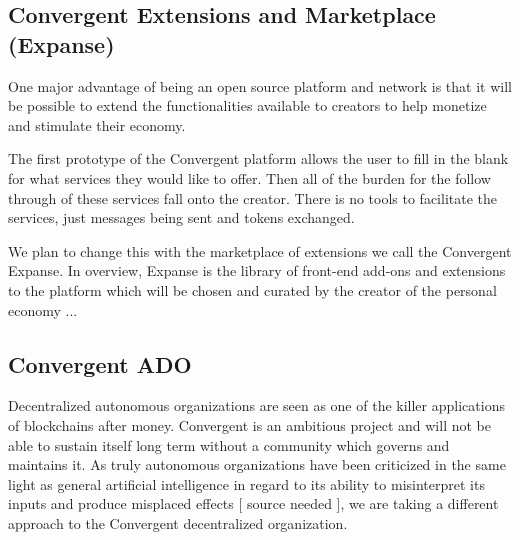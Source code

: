 \documentclass[a4paper]{article}
\begin{document}
\subsection{Convergent Extensions and Marketplace (Expanse)}

One major advantage of being an open source platform and network is that it will be possible to extend the functionalities available to creators to help monetize and stimulate their economy. 

The first prototype of the Convergent platform allows the user to fill in the blank for what services they would like to offer. Then all of the burden for the follow through of these services fall onto the creator. There is no tools to facilitate the services, just messages being sent and tokens exchanged.

We plan to change this with the marketplace of extensions we call the Convergent Expanse. In overview, Expanse is the library of front-end add-ons and extensions to the platform which will be chosen and curated by the creator of the personal economy ...

\subsection{Convergent ADO}

Decentralized autonomous organizations are seen as one of the killer applications of blockchains after money. Convergent is an ambitious project and will not be able to sustain itself long term without a community which governs and maintains it. As truly autonomous organizations have been criticized in the same light as general artificial intelligence in regard to its ability to misinterpret its inputs and produce misplaced effects [ source needed ], we are taking a different approach to the Convergent decentralized organization.
\end{document}

